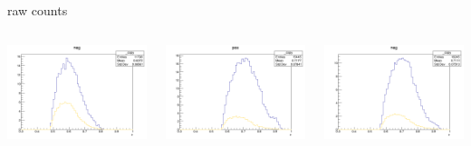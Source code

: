 \begin{frame}{raw counts}
\begin{columns}
\begin{column}[T]{0.25\textwidth}
\includegraphics[width = \textwidth]{results/yield/statistics/yield_x_Q2_z_0.50_3.979_0.60_neg.png}
\end{column}
\begin{column}[T]{0.25\textwidth}
\includegraphics[width = \textwidth]{results/yield/statistics/yield_x_Q2_z_0.50_3.979_0.70_pos.png}
\end{column}
\begin{column}[T]{0.25\textwidth}
\includegraphics[width = \textwidth]{results/yield/statistics/yield_x_Q2_z_0.50_3.979_0.70_neg.png}
\end{column}
\end{columns}
\end{frame}
